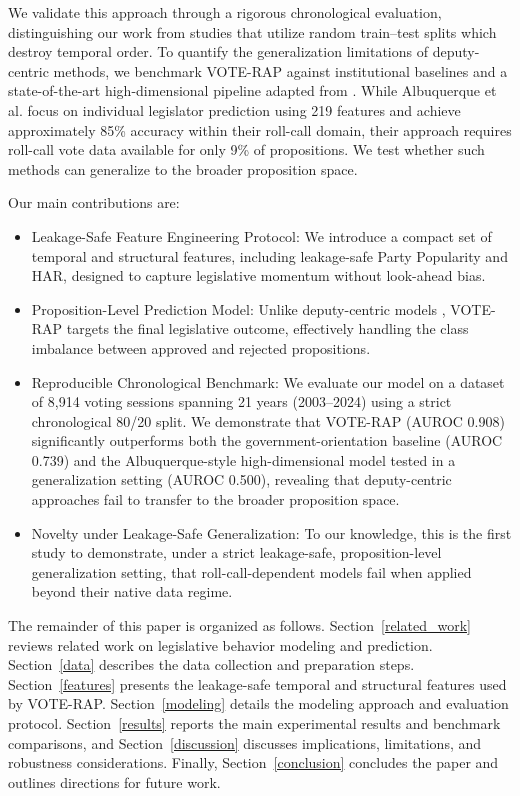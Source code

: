 \documentclass[review]{elsarticle}
\begin{document}
We validate this approach through a rigorous chronological evaluation, distinguishing our work from studies that utilize random train--test splits which destroy temporal order. To quantify the generalization limitations of deputy-centric methods, we benchmark VOTE-RAP against institutional baselines and a state-of-the-art high-dimensional pipeline adapted from \citet{Albuquerque2025Forecasting}. While Albuquerque et al. focus on individual legislator prediction using 219 features and achieve approximately 85\% accuracy within their roll-call domain, their approach requires roll-call vote data available for only 9\% of propositions. We test whether such methods can generalize to the broader proposition space.

Our main contributions are:
\begin{itemize}
\item Leakage-Safe Feature Engineering Protocol: We introduce a compact set of temporal and structural features, including leakage-safe Party Popularity and HAR, designed to capture legislative momentum without look-ahead bias.
\item Proposition-Level Prediction Model: Unlike deputy-centric models \citep{Kraft2021,Patil2020,Albuquerque2025Forecasting}, VOTE-RAP targets the final legislative outcome, effectively handling the class imbalance between approved and rejected propositions.
\item Reproducible Chronological Benchmark: We evaluate our model on a dataset of 8,914 voting sessions spanning 21 years (2003--2024) using a strict chronological 80/20 split. We demonstrate that VOTE-RAP (AUROC 0.908) significantly outperforms both the government-orientation baseline (AUROC 0.739) and the Albuquerque-style high-dimensional model tested in a generalization setting (AUROC 0.500), revealing that deputy-centric approaches fail to transfer to the broader proposition space.
\item Novelty under Leakage-Safe Generalization: To our knowledge, this is the first study to demonstrate, under a strict leakage-safe, proposition-level generalization setting, that roll-call-dependent models fail when applied beyond their native data regime.
\end{itemize}


The remainder of this paper is organized as follows. Section~\ref{related_work} reviews related work on legislative behavior modeling and prediction. Section~\ref{data} describes the data collection and preparation steps. Section~\ref{features} presents the leakage-safe temporal and structural features used by VOTE-RAP. Section~\ref{modeling} details the modeling approach and evaluation protocol. Section~\ref{results} reports the main experimental results and benchmark comparisons, and Section~\ref{discussion} discusses implications, limitations, and robustness considerations. Finally, Section~\ref{conclusion} concludes the paper and outlines directions for future work.
\end{document}
